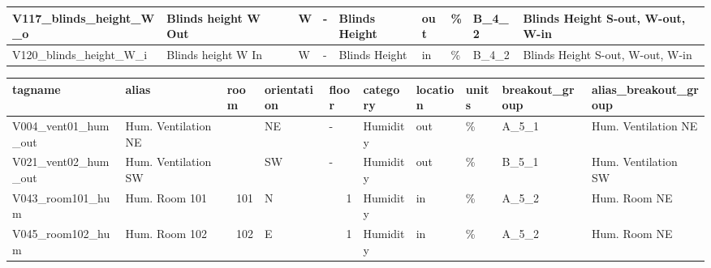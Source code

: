 \begin{landscape}
\begin{table}[htbp]
\begin{tabular}{|l|l|r|l|l|l|l|l|l|l|}
    \hline
    \rowcolor[rgb]{ .851,  .851,  .851} V117\_blinds\_height\_W\_o & Blinds height W Out &      & W    & -    & Blinds Height & out  & \%   & B\_4\_2 & Blinds Height S-out, W-out, W-in \bigstrut\\
    \hline
    V120\_blinds\_height\_W\_i & Blinds height W In &      & W    & -    & Blinds Height & in   & \%   & B\_4\_2 & Blinds Height S-out, W-out, W-in \bigstrut\\
    \hline
    \end{tabular}%
  \label{tab:metadata}%
\end{table}%
\end{landscape}
\restoregeometry


\begin{landscape}
\leavevmode
\newline
\newline
\begin{table}[htbp]
  \centering
   \scriptsize
    \begin{tabular}{|l|l|r|l|r|l|l|l|l|l|}
    \hline
    \rowcolor[rgb]{ 0,  0,  0} \textcolor[rgb]{ 1,  1,  1}{\textbf{tagname}} & \textcolor[rgb]{ 1,  1,  1}{\textbf{alias}} & \multicolumn{1}{l|}{\textcolor[rgb]{ 1,  1,  1}{\textbf{room}}} & \textcolor[rgb]{ 1,  1,  1}{\textbf{orientation}} & \multicolumn{1}{l|}{\textcolor[rgb]{ 1,  1,  1}{\textbf{floor}}} & \textcolor[rgb]{ 1,  1,  1}{\textbf{category}} & \textcolor[rgb]{ 1,  1,  1}{\textbf{location}} & \textcolor[rgb]{ 1,  1,  1}{\textbf{units}} & \textcolor[rgb]{ 1,  1,  1}{\textbf{breakout\_group}} & \textcolor[rgb]{ 1,  1,  1}{\textbf{alias\_breakout\_group}} \bigstrut\\
    \hline
    V004\_vent01\_hum\_out & Hum. Ventilation NE &      & NE   & \multicolumn{1}{l|}{-} & Humidity & out  & \%   & A\_5\_1 & Hum. Ventilation NE \bigstrut\\
    \hline
    \rowcolor[rgb]{ .851,  .851,  .851} V021\_vent02\_hum\_out & Hum. Ventilation SW &      & SW   & \multicolumn{1}{l|}{-} & Humidity & out  & \%   & B\_5\_1 & Hum. Ventilation SW \bigstrut\\
    \hline
    V043\_room101\_hum & Hum. Room 101  & 101  & N    & 1    & Humidity & in   & \%   & A\_5\_2 & Hum. Room NE \bigstrut\\
    \hline
    \rowcolor[rgb]{ .851,  .851,  .851} V045\_room102\_hum & Hum. Room 102 & 102  & E    & 1    & Humidity & in   & \%   & A\_5\_2 & Hum. Room NE \bigstrut\\

\end{tabular}
\end{table}
\end{landscape}
